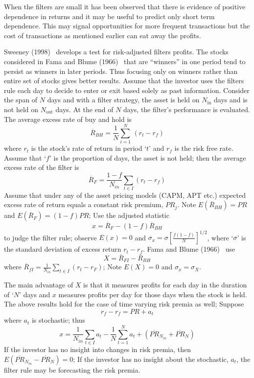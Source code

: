 When the filters are small it has been observed that there is evidence of positive dependence in returns and it may be useful to predict only short term dependence. This may signal opportunities for more frequent transactions but the cost of transactions as mentioned earlier can eat away the profits.


Sweeney (1998)~\cite{sweet} develops a test for risk-adjusted filters profits. The stocks considered in Fama and Blume (1966)~\cite{famablume} that are ``winners'' in one period tend to persist as winners in later periods. Thus focusing only on winners rather than entire set of stocks gives better results. Assume that the investor uses the filters rule each day to decide to enter or exit based solely as past information. Consider the span of $N$ days and with a filter strategy, the asset is held on $N_{\text{in}}$ days and is not held on $N_{\text{out}}$ days. At the end of $N$ days, the filter's performance is evaluated. The average excess rate of buy and hold is
	\[
	\overline{R}_{BH}=\dfrac{1}{N} \sum_{i=1}^N \, (r_t - r_f )
	\]
where $r_t$ is the stock's rate of return in period `$t$' and $r_f$ is the risk free rate. Assume that `$f$' is the proportion of days, the asset is not held; then the average excess rate of the filter is
	\[
	\overline{R}_{F}=\dfrac{1-f}{N_{in}}\sum_{t \in I} (r_t - r_f) 
	\]
Assume that under any of the asset pricing models (CAPM, APT etc.) expected excess rate of return equals a constant risk premium, $PR_{j}$. Note $E(\overline{R}_{BH}) = PR$ and $E(\overline{R}_{F}) = (1-f)PR$; Use the adjusted statistic
	\begin{equation}\label{eqn:xbarfirst}
	x= \overline{R}_{F} - (1-f)\overline{R}_{BH}
	\end{equation}
to judge the filter rule; observe $E(x) = 0$ and $\sigma_{x} = \sigma[\frac{f(1-f)}{N}]^{1/2}$, where `$\sigma$' is the standard deviation of excess return $r_t - r_f$. Fama and Blume (1966)~\cite{famablume} use
	\begin{equation}\label{eqn:bigxbar}
	X = \overline{R}_{FI} - \overline{R}_{BH}
	\end{equation}
where $\overline{R}_{fI} = \frac{1}{N_{in}}\sum_{t\in I}(r_t - r_F)$; Note $E(X) = 0$ and $\sigma_{x} = \sigma_{X}$.


The main advantage of $X$ is that it measures profits for each day in the duration of `$N$' days and $x$ measures profits per day for those days when the stock is held. The above results hold for the case of time varying risk premia as well; Suppose
	\[
	r_f - r_f = PR + a_t
	\]
where $a_t$ is stochastic; thus
	\begin{equation}\label{eqn:anotherxeq}
	x = \dfrac{1}{N_{in}} \sum_{t \in I} a_t - \dfrac{1}{N} \sum_{t=1}^N a_t + (\overline{PR}_{N_{in} }+\overline{PR}_N )
	\end{equation}
If the investor has no insight into changes in risk premia, then $E(\overline{PR}_{N_{in}}-\overline{PR}_{N}) = 0$; If the investor has no insight about the stochastic, $a_t$, the filter rule may be forecasting the risk premia.


